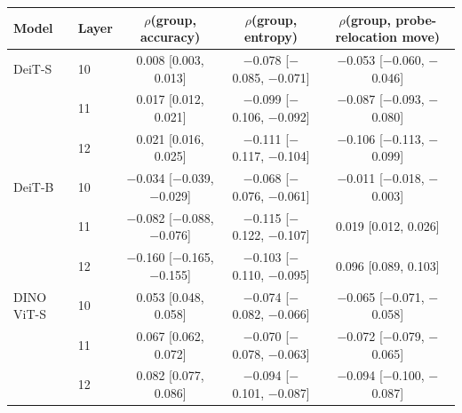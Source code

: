 \begin{tabular}{llccc}
\toprule
Model & Layer & $\rho$(group, accuracy) & $\rho$(group, entropy) & \makecell{$\rho$(group, probe-\\relocation move)} \\
\midrule
DeiT-S & 10 & 0.008 {\scriptsize [0.003, 0.013]} & $-$0.078 {\scriptsize [$-$0.085, $-$0.071]} & $-$0.053 {\scriptsize [$-$0.060, $-$0.046]} \\
 & 11 & 0.017 {\scriptsize [0.012, 0.021]} & $-$0.099 {\scriptsize [$-$0.106, $-$0.092]} & $-$0.087 {\scriptsize [$-$0.093, $-$0.080]} \\
 & 12 & 0.021 {\scriptsize [0.016, 0.025]} & $-$0.111 {\scriptsize [$-$0.117, $-$0.104]} & $-$0.106 {\scriptsize [$-$0.113, $-$0.099]} \\
\midrule
DeiT-B & 10 & $-$0.034 {\scriptsize [$-$0.039, $-$0.029]} & $-$0.068 {\scriptsize [$-$0.076, $-$0.061]} & $-$0.011 {\scriptsize [$-$0.018, $-$0.003]} \\
 & 11 & $-$0.082 {\scriptsize [$-$0.088, $-$0.076]} & $-$0.115 {\scriptsize [$-$0.122, $-$0.107]} & 0.019 {\scriptsize [0.012, 0.026]} \\
 & 12 & $-$0.160 {\scriptsize [$-$0.165, $-$0.155]} & $-$0.103 {\scriptsize [$-$0.110, $-$0.095]} & 0.096 {\scriptsize [0.089, 0.103]} \\
\midrule
DINO ViT-S & 10 & 0.053 {\scriptsize [0.048, 0.058]} & $-$0.074 {\scriptsize [$-$0.082, $-$0.066]} & $-$0.065 {\scriptsize [$-$0.071, $-$0.058]} \\
 & 11 & 0.067 {\scriptsize [0.062, 0.072]} & $-$0.070 {\scriptsize [$-$0.078, $-$0.063]} & $-$0.072 {\scriptsize [$-$0.079, $-$0.065]} \\
 & 12 & 0.082 {\scriptsize [0.077, 0.086]} & $-$0.094 {\scriptsize [$-$0.101, $-$0.087]} & $-$0.094 {\scriptsize [$-$0.100, $-$0.087]} \\
\bottomrule
\end{tabular}
